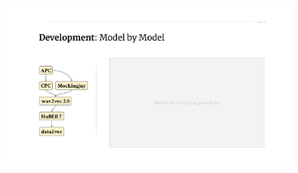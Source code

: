 \begin{frame}
\begin{columns}[t]
\begin{column}{0.20\textwidth}
\begin{figure}[\textwidth]
            \end{figure}
        \end{column}
        {\textcolor{black!40}{\vrule{}}}
        \hspace{0.050\textwidth}
        \begin{column}{0.65\textwidth}
            \begin{figure}[\textwidth]
                \centering
                \includegraphics[width=\textwidth]{figures/brief-model-0.pdf}
            \end{figure}
        \end{column}
        \hspace{0.020\textwidth}
    \end{columns}
    \endgroup
\end{frame}


